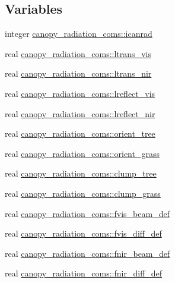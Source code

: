 \subsection*{Variables}
\begin{DoxyCompactItemize}
\item 
integer \hyperlink{namespacecanopy__radiation__coms_a14fc38d8fcab4e07489c6a98d0fa1ec0}{canopy\+\_\+radiation\+\_\+coms\+::icanrad}
\item 
real \hyperlink{namespacecanopy__radiation__coms_a87104ccbd0550f1c136fa52e924b4757}{canopy\+\_\+radiation\+\_\+coms\+::ltrans\+\_\+vis}
\item 
real \hyperlink{namespacecanopy__radiation__coms_af7cd19c8b528f9ad44a71f0a35c6ce1d}{canopy\+\_\+radiation\+\_\+coms\+::ltrans\+\_\+nir}
\item 
real \hyperlink{namespacecanopy__radiation__coms_a93d73e57e54635c41e0ccffe6025ef2f}{canopy\+\_\+radiation\+\_\+coms\+::lreflect\+\_\+vis}
\item 
real \hyperlink{namespacecanopy__radiation__coms_a10712ab8a7b1bfada454fdfaa9e4a919}{canopy\+\_\+radiation\+\_\+coms\+::lreflect\+\_\+nir}
\item 
real \hyperlink{namespacecanopy__radiation__coms_a02f343f29bc50bd43ad7a47feca0aeb9}{canopy\+\_\+radiation\+\_\+coms\+::orient\+\_\+tree}
\item 
real \hyperlink{namespacecanopy__radiation__coms_a9a05bcd1d22939f34bc3b6d2f4464f02}{canopy\+\_\+radiation\+\_\+coms\+::orient\+\_\+grass}
\item 
real \hyperlink{namespacecanopy__radiation__coms_a56f3277cb77422d513a00732dec93b73}{canopy\+\_\+radiation\+\_\+coms\+::clump\+\_\+tree}
\item 
real \hyperlink{namespacecanopy__radiation__coms_a4ab5b29df445f0f0c4e230192ad288ba}{canopy\+\_\+radiation\+\_\+coms\+::clump\+\_\+grass}
\item 
real \hyperlink{namespacecanopy__radiation__coms_ac004366e46d368e0959443f710484ae0}{canopy\+\_\+radiation\+\_\+coms\+::fvis\+\_\+beam\+\_\+def}
\item 
real \hyperlink{namespacecanopy__radiation__coms_a4b2b1be923f4d3c9c9a60e315391af77}{canopy\+\_\+radiation\+\_\+coms\+::fvis\+\_\+diff\+\_\+def}
\item 
real \hyperlink{namespacecanopy__radiation__coms_a9cf9456a8e225d5d5cbeeb3c0a3c1d9f}{canopy\+\_\+radiation\+\_\+coms\+::fnir\+\_\+beam\+\_\+def}
\item 
real \hyperlink{namespacecanopy__radiation__coms_a1d50899df57055efdbfa121479ac3710}{canopy\+\_\+radiation\+\_\+coms\+::fnir\+\_\+diff\+\_\+def}

\end{DoxyCompactItemize}
